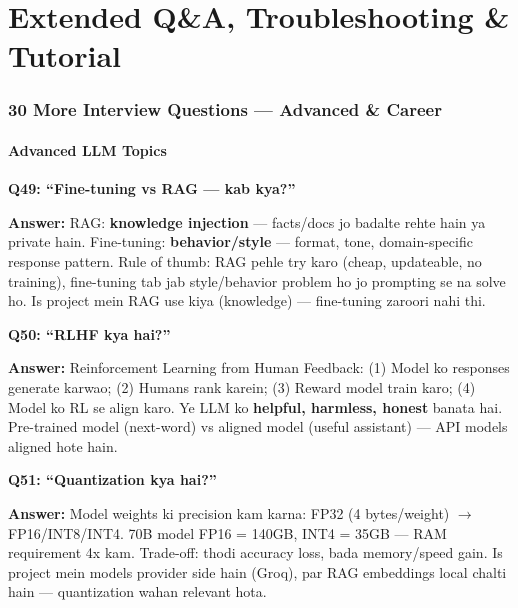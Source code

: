 \newpage

\part{Extended Q\&A, Troubleshooting \& Tutorial}

\section{30 More Interview Questions --- Advanced \& Career}

\subsection{Advanced LLM Topics}

\begin{interviewbox}
\textbf{Q49: ``Fine-tuning vs RAG --- kab kya?''}

\textbf{Answer:} RAG: \textbf{knowledge injection} --- facts/docs jo badalte rehte hain ya private hain. Fine-tuning: \textbf{behavior/style} --- format, tone, domain-specific response pattern. Rule of thumb: RAG pehle try karo (cheap, updateable, no training), fine-tuning tab jab style/behavior problem ho jo prompting se na solve ho. Is project mein RAG use kiya (knowledge) --- fine-tuning zaroori nahi thi.
\end{interviewbox}

\begin{interviewbox}
\textbf{Q50: ``RLHF kya hai?''}

\textbf{Answer:} Reinforcement Learning from Human Feedback: (1) Model ko responses generate karwao; (2) Humans rank karein; (3) Reward model train karo; (4) Model ko RL se align karo. Ye LLM ko \textbf{helpful, harmless, honest} banata hai. Pre-trained model (next-word) vs aligned model (useful assistant) --- API models aligned hote hain.
\end{interviewbox}

\begin{interviewbox}
\textbf{Q51: ``Quantization kya hai?''}

\textbf{Answer:} Model weights ki precision kam karna: FP32 (4 bytes/weight) $\rightarrow$ FP16/INT8/INT4. 70B model FP16 = 140GB, INT4 = 35GB --- RAM requirement 4x kam. Trade-off: thodi accuracy loss, bada memory/speed gain. Is project mein models provider side hain (Groq), par RAG embeddings local chalti hain --- quantization wahan relevant hota.
\end{interviewbox}

